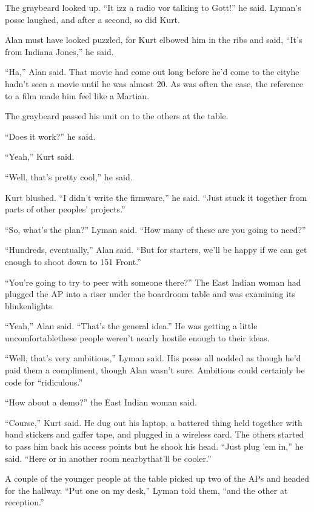 The graybeard looked up.  ``It izz a radio vor talking to Gott!'' he
said.  Lyman's posse laughed, and after a second, so did Kurt.

Alan must have looked puzzled, for Kurt elbowed him in the ribs and
said, ``It's from Indiana Jones,'' he said.

``Ha,'' Alan said.  That movie had come out long before he'd come to
the city\dash{}he hadn't seen a movie until he was almost 20.  As was
often the case, the reference to a film made him feel like a Martian.

The graybeard passed his unit on to the others at the table.

``Does it work?'' he said.

``Yeah,'' Kurt said.

``Well, that's pretty cool,'' he said.

Kurt blushed.  ``I didn't write the firmware,'' he said.  ``Just stuck
it together from parts of other peoples' projects.''

``So, what's the plan?'' Lyman said.  ``How many of these are you
going to need?''

``Hundreds, eventually,'' Alan said.  ``But for starters, we'll be
happy if we can get enough to shoot down to 151 Front.''

``You're going to try to peer with someone there?'' The East Indian
woman had plugged the AP into a riser under the boardroom table and
was examining its blinkenlights.

``Yeah,'' Alan said.  ``That's the general idea.'' He was getting a
little uncomfortable\dash{}these people weren't nearly hostile enough to
their ideas.

``Well, that's very ambitious,'' Lyman said.  His posse all nodded as
though he'd paid them a compliment, though Alan wasn't sure. 
Ambitious could certainly be code for ``ridiculous.''

``How about a demo?'' the East Indian woman said.

``Course,'' Kurt said.  He dug out his laptop, a battered thing held
together with band stickers and gaffer tape, and plugged in a wireless
card.  The others started to pass him back his access points but he
shook his head.  ``Just plug 'em in,'' he said.  ``Here or in another
room nearby\dash{}that'll be cooler.''

A couple of the younger people at the table picked up two of the APs
and headed for the hallway.  ``Put one on my desk,'' Lyman told them,
``and the other at reception.''

